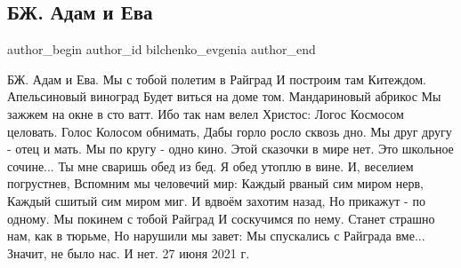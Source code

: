  
 
 
 
 
 
\subsection{БЖ. Адам и Ева}
\label{sec:27_06_2021.fb.bilchenko_evgenia.4.adam_i_eva}
\ifcmt
 author_begin
   author_id bilchenko_evgenia
 author_end
\fi

БЖ. Адам и Ева.
Мы с тобой полетим в Райград
И построим там Китеждом.
Апельсиновый виноград
Будет виться на доме том.
Мандариновый абрикос
Мы зажжем на окне в сто ватт.
Ибо так нам велел Христос:
Логос Космосом целовать.
Голос Колосом обнимать,
Дабы горло росло сквозь дно.
Мы друг другу - отец и мать.
Мы по кругу - одно кино.
Этой сказочки в мире нет.
Это школьное сочине...
Ты мне сваришь обед из бед.
Я обед утоплю в вине.
И, веселием погрустнев,
Вспомним мы человечий мир:
Каждый рваный сим миром нерв,
Каждый сшитый сим миром миг.
И вдвоём захотим назад,
Но прикажут - по одному.
Мы покинем с тобой Райград 
И соскучимся по нему.
Станет страшно нам, как в тюрьме,
Но нарушили мы завет:
Мы спускались с Райграда вме...
Значит, не было нас. И нет.
27 июня 2021 г.

